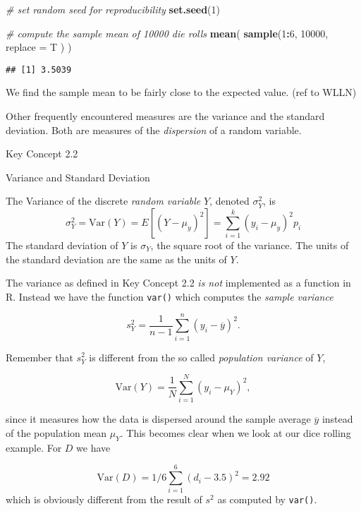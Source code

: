 \documentclass[]{book}
\newenvironment{Shaded}{\begin{snugshade}}{\end{snugshade}}
\newcommand{\KeywordTok}[1]{\textcolor[rgb]{0.13,0.29,0.53}{\textbf{#1}}}
\newcommand{\DataTypeTok}[1]{\textcolor[rgb]{0.13,0.29,0.53}{#1}}
\newcommand{\DecValTok}[1]{\textcolor[rgb]{0.00,0.00,0.81}{#1}}
\newcommand{\CommentTok}[1]{\textcolor[rgb]{0.56,0.35,0.01}{\textit{#1}}}
\newcommand{\OperatorTok}[1]{\textcolor[rgb]{0.81,0.36,0.00}{\textbf{#1}}}
\newcommand{\NormalTok}[1]{#1}
\theoremstyle{definition}
\theoremstyle{definition}
\theoremstyle{definition}
\theoremstyle{remark}
\begin{document}
\begin{Shaded}
\begin{Highlighting}[]
\CommentTok{# set random seed for reproducibility}
\KeywordTok{set.seed}\NormalTok{(}\DecValTok{1}\NormalTok{)}

\CommentTok{# compute the sample mean of 10000 die rolls}
\KeywordTok{mean}\NormalTok{(}
    \KeywordTok{sample}\NormalTok{(}\DecValTok{1}\OperatorTok{:}\DecValTok{6}\NormalTok{, }
           \DecValTok{10000}\NormalTok{, }
           \DataTypeTok{replace =}\NormalTok{ T}
\NormalTok{           )}
\NormalTok{    )}
\end{Highlighting}
\end{Shaded}

\begin{verbatim}
## [1] 3.5039
\end{verbatim}

We find the sample mean to be fairly close to the expected value. (ref
to WLLN)

Other frequently encountered measures are the variance and the standard
deviation. Both are measures of the \emph{dispersion} of a random
variable.

Key Concept 2.2

Variance and Standard Deviation

The Variance of the discrete \emph{random variable} \(Y\), denoted
\(\sigma^2_Y\), is
\[ \sigma^2_Y = \text{Var}(Y) = E\left[(Y-\mu_y)^2\right] = \sum_{i=1}^k (y_i - \mu_y)^2 p_i \]
The standard deviation of \(Y\) is \(\sigma_Y\), the square root of the
variance. The units of the standard deviation are the same as the units
of \(Y\).

The variance as defined in Key Concept 2.2 \emph{is not} implemented as
a function in R. Instead we have the function \texttt{var()} which
computes the \emph{sample variance}

\[ s^2_Y = \frac{1}{n-1} \sum_{i=1}^n (y_i - \overline{y})^2. \]

Remember that \(s^2_Y\) is different from the so called \emph{population
variance} of \(Y\),

\[ \text{Var}(Y) = \frac{1}{N} \sum_{i=1}^N (y_i - \mu_Y)^2, \]

since it measures how the data is dispersed around the sample average
\(\overline{y}\) instead of the population mean \(\mu_Y\). This becomes
clear when we look at our dice rolling example. For \(D\) we have

\[ \text{Var}(D) = 1/6 \sum_{i=1}^6 (d_i - 3.5)^2 = 2.92  \] which is
obviously different from the result of \(s^2\) as computed by
\texttt{var()}.
\end{document}
